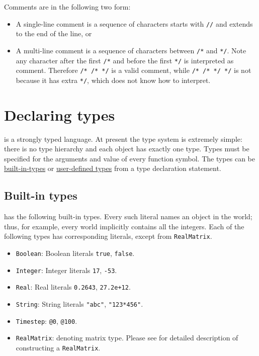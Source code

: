 \documentclass[12pt]{article}
\begin{document}
Comments are in the following two form:
\begin{itemize}
\item A single-line comment is a sequence of characters starts with \verb|//| and extends to the end of the line, or
\item A multi-line comment is a sequence of characters between \verb|/*| and \verb|*/|. Note any character after the first \verb|/*| and before the first \verb|*/| is interpreted as comment. Therefore \verb|/* /* */| is a valid comment, while \verb|/* /* */ */| is not because it has extra \verb|*/|, which \bl does not know how to interpret.
\end{itemize}

\section{Declaring types}\label{type-declaration-section}
\bl is a strongly typed language. At present the type system is extremely simple: there is no type hierarchy
and each object has exactly one type. Types must be specified for the arguments and value of every function symbol.
The types can be \hyperref[builtin-type-section]{built-in-types} or \hyperref[user-type-section]{user-defined types} from a type declaration statement.



\subsection{Built-in types}\label{builtin-type-section}
\bl has the following built-in types. 
Every such literal names an object in the world; thus, for example, every world implicitly contains all the integers.
Each of the following types has corresponding literals, except from \verb|RealMatrix|. 
\begin{itemize}
\item \verb|Boolean|: Boolean literals \verb|true|, \verb|false|.
\item \verb|Integer|: Integer literals \verb|17|, \verb|-53|.
\item \verb|Real|: Real literals \verb|0.2643|, \verb|27.2e+12|.
\item \verb|String|: String literals \verb|"abc"|, \verb|"123*456"|.
\item \verb|Timestep|: \verb|@0|, \verb|@100|. 
\item \verb|RealMatrix|: denoting matrix type. Please see  for detailed description of constructing a \verb|RealMatrix|.
\end{itemize}
\end{document}
